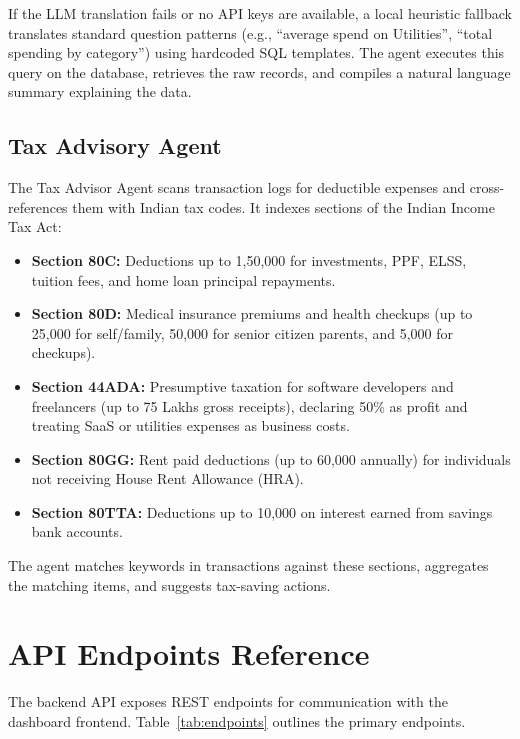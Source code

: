 \documentclass[11pt,a4paper]{article}
\begin{document}
If the LLM translation fails or no API keys are available, a local heuristic fallback translates standard question patterns (e.g., ``average spend on Utilities'', ``total spending by category'') using hardcoded SQL templates. The agent executes this query on the database, retrieves the raw records, and compiles a natural language summary explaining the data.

\subsection{Tax Advisory Agent}
The Tax Advisor Agent scans transaction logs for deductible expenses and cross-references them with Indian tax codes. It indexes sections of the Indian Income Tax Act:
\begin{itemize}
    \item \textbf{Section 80C:} Deductions up to 1,50,000 for investments, PPF, ELSS, tuition fees, and home loan principal repayments.
    \item \textbf{Section 80D:} Medical insurance premiums and health checkups (up to 25,000 for self/family, 50,000 for senior citizen parents, and 5,000 for checkups).
    \item \textbf{Section 44ADA:} Presumptive taxation for software developers and freelancers (up to 75 Lakhs gross receipts), declaring 50\% as profit and treating SaaS or utilities expenses as business costs.
    \item \textbf{Section 80GG:} Rent paid deductions (up to 60,000 annually) for individuals not receiving House Rent Allowance (HRA).
    \item \textbf{Section 80TTA:} Deductions up to 10,000 on interest earned from savings bank accounts.
\end{itemize}

The agent matches keywords in transactions against these sections, aggregates the matching items, and suggests tax-saving actions.

\section{API Endpoints Reference}
The backend API exposes REST endpoints for communication with the dashboard frontend. Table~\ref{tab:endpoints} outlines the primary endpoints.
\end{document}
